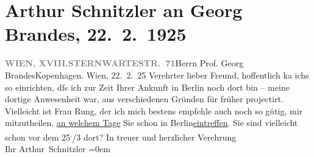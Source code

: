 

         
         \renewcommand{\erwaehntePersonen}{Personen: Georg Brandes, Gertrud Rung}
         \renewcommand{\erwaehnteOrte}{Orte: Berlin, Kopenhagen, Sternwartestraße, Wien, XVIII., Währing}
         \renewcommand{\erwaehnteWerke}{}
               \section[Arthur Schnitzler an Georg Brandes, 22. 2. 1925]{ Arthur Schnitzler an Georg Brandes, 22. 2. 1925}\nopagebreak{}\rehead{ }\begin{ledgroupsized}[t]{13cm}\normalsize\beginnumbering \toendnotes[C]{\smallbreak\pagebreak[2]} 
\toendnotes[C]{\smallbreak}\pstart{}{\pb}\label{T_L02434-1v}\label{T_L02434-1h}\pend{}\pstart{}\textcolor{gray}{\textbf{WIEN, XVIII.}}\pend{}\pstart{}\textcolor{gray}{\textbf{STERNWARTESTR. 71}}\pend{}{\bigskip}\pstart{}Herrn Prof. Georg Brandes\pend{}\pstart{}Kopenhagen. \pend{}{\bigskip}\pstart
           \raggedleft{}{\pb}Wien, 22. 2. 25\pend
           \pstart
           Verehrter lieber Freund, hoffentlich ka{\geminationn} ichs so einrichten, dſs ich zur Zeit Ihrer Ankunft in Berlin noch dort bin – meine dortige Anwesenheit war, aus
               verschiedenen Gründen für früher projectirt. Vielleicht ist Frau Rung, der ich mich bestens empfehle auch noch so gütig, mir
               mitzutheilen, \uline{an welchem Tage} Sie schon in Berlin\uline{eintreffen}. Sie sind vielleicht schon vor dem 25\substVorne{}\textsuperscript{.}\substDazwischen{}/3\substHinten{} dort?\pend
           \pstart
           In treuer und herzlicher Verehrung{\\[\baselineskip]}Ihr \spacefill\mbox{Arthur Schnitzler}\pend
           \leftskip=0em{}
         

\end{ledgroupsized}
